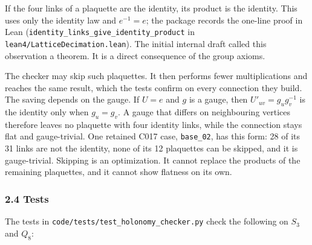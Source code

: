\documentclass[
  11pt,
]{article}
\begin{document}
If the four links of a plaquette are the identity, its product is the
identity. This uses only the identity law and \(e^{-1} = e\); the
package records the one-line proof in Lean
(\texttt{identity\_\allowbreak{}links\_\allowbreak{}give\_\allowbreak{}identity\_\allowbreak{}product}
in \texttt{lean4/\allowbreak{}LatticeDecimation.lean}). The initial
internal draft called this observation a theorem. It is a direct
consequence of the group axioms.

The checker may skip such plaquettes. It then performs fewer
multiplications and reaches the same result, which the tests confirm on
every connection they build. The saving depends on the gauge. If
\(U = e\) and \(g\) is a gauge, then \(U'_{uv} = g_u g_v^{-1}\) is the
identity only when \(g_u = g_v\). A gauge that differs on neighbouring
vertices therefore leaves no plaquette with four identity links, while
the connection stays flat and gauge-trivial. One retained C017 case,
\texttt{base\_\allowbreak{}02}, has this form: 28 of its 31 links are
not the identity, none of its 12 plaquettes can be skipped, and it is
gauge-trivial. Skipping is an optimization. It cannot replace the
products of the remaining plaquettes, and it cannot show flatness on its
own.

\hypertarget{tests}{%
\subsubsection{2.4 Tests}\label{tests}}

The tests in
\texttt{code/\allowbreak{}tests/\allowbreak{}test\_\allowbreak{}holonomy\_\allowbreak{}checker.py}
check the following on \(S_3\) and \(Q_8\):
\end{document}
